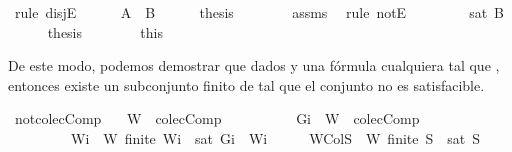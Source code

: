 \begin{isabellebody}
\ {\isacharparenleft}rule\ disjE{\isacharparenright}\isanewline
\ \ \ \ \isamarkupfalse%
\ {\isachardoublequoteopen}{\isasymnot}{\isacharparenleft}A\ {\isasymsubseteq}\ B{\isacharparenright}{\isachardoublequoteclose}\isanewline
\ \ \ \ \isamarkupfalse%
\ {\isacharquery}thesis\isanewline
\ \ \ \ \ \ \isamarkupfalse%
\ assms{\isacharparenleft}{}{\isacharparenright}\ \isamarkupfalse%
\ {\isacharparenleft}rule\ notE{\isacharparenright}\isanewline
\ \ \isamarkupfalse%
\isanewline
\ \ \ \ \isamarkupfalse%
\ {\isachardoublequoteopen}{\isasymnot}{\isacharparenleft}sat\ B{\isacharparenright}{\isachardoublequoteclose}\isanewline
\ \ \ \ \isamarkupfalse%
\ {\isacharquery}thesis\isanewline
\ \ \ \ \ \ \isamarkupfalse%
\ this\isanewline
\ \ \isamarkupfalse%
\isanewline
{}\isamarkupfalse%
%
\endisatagproof
{\isafoldproof}%
%
\isadelimproof
%
\endisadelimproof
%
\begin{isamarkuptext}%
De este modo, podemos demostrar que dados  y  una fórmula cualquiera tal que 
  , entonces existe un subconjunto finito  de  tal que el conjunto  
  no es satisfacible.%
\end{isamarkuptext}\isamarkuptrue%
\isamarkupfalse%
\ not{\isacharunderscore}colecComp{\isacharcolon}\isanewline
\ \ \ {\isachardoublequoteopen}W\ {\isasymin}\ colecComp{\isachardoublequoteclose}\isanewline
\ \ \ \ \ \ \ \ \ \ {\isachardoublequoteopen}{\isacharbraceleft}Gi{\isacharbraceright}\ {\isasymunion}\ W\ {\isasymnotin}\ colecComp{\isachardoublequoteclose}\isanewline
\ \ \ \ \ \ \ \ \ {\isachardoublequoteopen}{\isasymexists}Wi\ {\isasymsubseteq}\ W{\isachardot}\ finite\ Wi\ {\isasymand}\ {\isasymnot}{\isacharparenleft}sat\ {\isacharparenleft}{\isacharbraceleft}Gi{\isacharbraceright}\ {\isasymunion}\ Wi{\isacharparenright}{\isacharparenright}{\isachardoublequoteclose}\isanewline
%
\isadelimproof
%
\endisadelimproof
%
\isatagproof
{}\isamarkupfalse%
\ {\isacharminus}\isanewline
\ \ \isamarkupfalse%
\ WCol{\isacharcolon}{\isachardoublequoteopen}{\isasymforall}S{\isacharprime}\ {\isasymsubseteq}\ W{\isachardot}\ finite\ S{\isacharprime}\ {\isasymlongrightarrow}\ sat\ S{\isacharprime}{\isachardoublequoteclose}\isanewline

\end{isabellebody}
